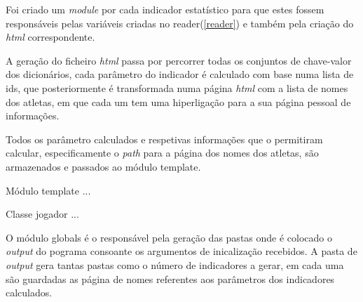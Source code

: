 Foi criado um \textit{module} por cada indicador estatístico para que estes fossem
responsáveis pelas variáveis criadas no reader(\ref{reader}) e também pela criação
do \textit{html} correspondente.

A geração do ficheiro \textit{html} passa por percorrer todas os conjuntos de chave-valor
dos dicionários, cada parâmetro do indicador é calculado com base numa lista de ids, que posteriormente é  
transformada numa página \textit{html} com a lista de nomes dos atletas, em que cada um tem uma hiperligação 
para a sua página pessoal de informações. 

Todos os parâmetro calculados e respetivas informações que o permitiram calcular, especificamente o 
\textit{path} para a página dos nomes dos atletas, são armazenados e passados ao módulo template.

Módulo template ... 

Classe jogador ...

O módulo globals é o responsável pela geração das pastas onde é colocado o \textit{output} do pograma
consoante os argumentos de inicalização recebidos. A pasta de \textit{output} gera tantas pastas como 
o número de indicadores a gerar, em cada uma são guardadas as página de nomes referentes aos parâmetros
dos indicadores calculados.

